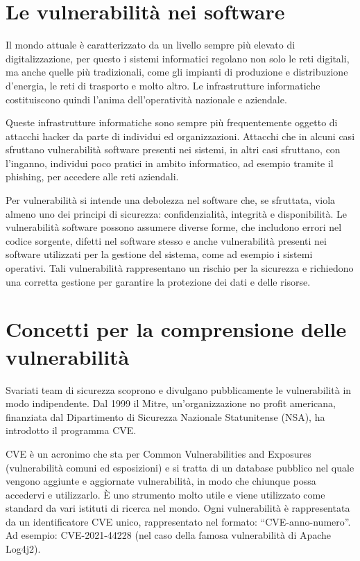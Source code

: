 \section{Le vulnerabilità nei software}
Il mondo attuale è caratterizzato da un livello sempre più elevato di
digitalizzazione, per questo i sistemi informatici regolano non solo
le reti digitali, ma anche quelle più tradizionali, come gli impianti di
produzione e distribuzione d’energia, le reti di trasporto e molto altro. 
Le infrastrutture informatiche costituiscono quindi l’anima dell’operatività 
nazionale e aziendale.

Queste infrastrutture informatiche sono sempre più frequentemente oggetto 
di attacchi hacker da parte di individui ed organizzazioni. 
Attacchi che in alcuni casi sfruttano vulnerabilità software presenti nei 
sistemi, in altri casi sfruttano, con l’inganno, individui poco pratici in 
ambito informatico, ad esempio tramite il phishing, per accedere alle reti 
aziendali.

Per vulnerabilità si intende una debolezza nel software che, se sfruttata, 
viola almeno uno dei principi di sicurezza: confidenzialità, integrità e 
disponibilità. Le vulnerabilità software possono assumere diverse forme, 
che includono errori nel codice sorgente, difetti nel software stesso e 
anche vulnerabilità presenti nei software utilizzati per la gestione del 
sistema, come ad esempio i sistemi operativi. Tali vulnerabilità rappresentano 
un rischio per la sicurezza e richiedono una corretta gestione per garantire 
la protezione dei dati e delle risorse.


\section{Concetti per la comprensione delle vulnerabilità}
Svariati team di sicurezza scoprono e divulgano pubblicamente le vulnerabilità
in modo indipendente. Dal 1999 il Mitre, un'organizzazione no profit 
americana, finanziata dal Dipartimento di Sicurezza Nazionale 
Statunitense (NSA), ha introdotto il programma CVE.

CVE è un acronimo che sta per Common Vulnerabilities and Exposures
(vulnerabilità comuni ed esposizioni) e si tratta di un database pubblico nel 
quale vengono aggiunte e aggiornate vulnerabilità, in modo che chiunque possa 
accedervi e utilizzarlo. 
È uno strumento molto utile e viene utilizzato come standard da vari istituti 
di ricerca nel mondo. Ogni vulnerabilità è rappresentata da un identificatore 
CVE unico, rappresentato nel formato: “CVE-anno-numero”. 
Ad esempio: CVE-2021-44228 (nel caso della famosa vulnerabilità 
di Apache Log4j2).

